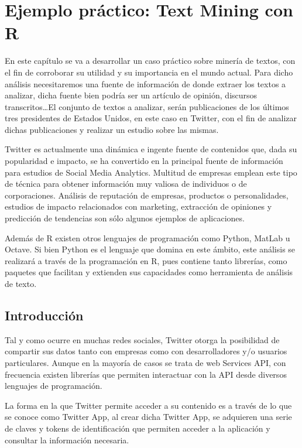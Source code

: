 
\chapter{Ejemplo práctico: Text Mining con R}
\label{cha:Text-mining-r}

En este capítulo se va a desarrollar un caso práctico sobre minería de textos, con el fin de corroborar 
su utilidad y su importancia en el mundo actual. Para dicho análisis necesitaremos una fuente de 
información de donde extraer los textos a analizar, dicha fuente bien podría ser un artículo de opinión, 
discursos transcritos…El conjunto de textos a analizar, serán publicaciones de los últimos tres presidentes 
de Estados Unidos, en este caso en Twitter, con el fin de analizar dichas publicaciones y realizar un estudio
sobre las mismas.

Twitter es actualmente una dinámica e ingente fuente de contenidos que, dada su popularidad e impacto, 
se ha convertido en la principal fuente de información para estudios de Social Media Analytics. Multitud 
de empresas emplean este tipo de técnica para obtener información muy valiosa de individuos o de 
corporaciones. Análisis de reputación de empresas, productos o personalidades, estudios de impacto 
relacionados con marketing, extracción de opiniones y predicción de tendencias son sólo algunos ejemplos 
de aplicaciones.

Además de R existen otros lenguajes de programación como Python, MatLab u Octave. Si bien Python es el 
lenguaje que domina en este ámbito, este análisis se realizará a través de la programación en R, pues 
contiene tanto librerías, como paquetes que facilitan y extienden sus capacidades como herramienta de 
análisis de texto.


\section{Introducción}
\label{sec:introduccion}

Tal y como ocurre en muchas redes sociales, Twitter otorga la posibilidad de compartir sus datos tanto 
con empresas como con desarrolladores y/o usuarios particulares. Aunque en la mayoría de casos se trata 
de web Services API, con frecuencia existen librerías que permiten interactuar con la API desde diversos 
lenguajes de programación. 

La forma en la que Twitter permite acceder a su contenido es a través de lo que se conoce como Twitter 
App, al crear dicha Twitter App, se adquieren una serie de claves y tokens de identificación que 
permiten acceder a la aplicación y consultar la información necesaria.  


